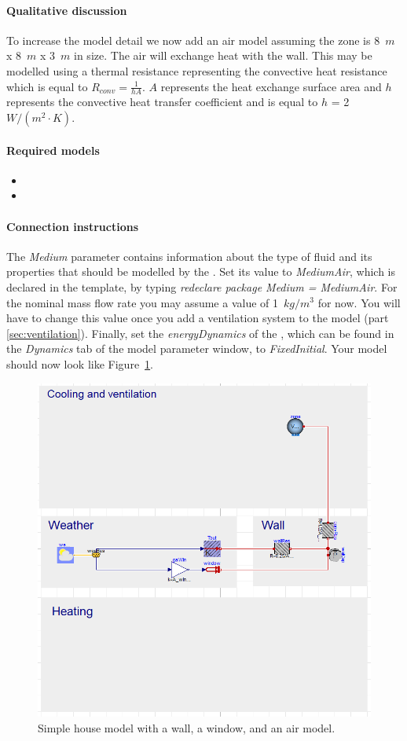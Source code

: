 \documentclass[10pt,a4paper]{article}
\begin{document}
\paragraph{Qualitative discussion}
To increase the model detail we now add an air model assuming the zone is 8~$m$ x 8~$m$ x 3~$m$ in size. The air will exchange heat with the wall. This may be modelled using a thermal resistance representing the convective heat resistance which is equal to $R_{conv}=\frac{1}{hA}$. $A$ represents the heat exchange surface area and $h$ represents the convective heat transfer coefficient and is equal to $h$ = 2~${W/(m^2\cdot K)}$.

\paragraph{Required models}
\begin{itemize}
\item {}
\item {}
\end{itemize}

\paragraph{Connection instructions}
The  \textit{Medium} parameter contains information about the type of fluid and its properties that should be modelled by the . Set its value to \textit{MediumAir}, which is declared in the template, by typing \textit{redeclare package Medium = MediumAir}. For the nominal mass flow rate you may assume a value of 1~$kg/m^3$ for now. You will have to change this value once you add a ventilation system to the model (part \ref{sec:ventilation}). Finally, set the \textit{energyDynamics} of the , which can be found in the \textit{Dynamics} tab of the model parameter window, to \textit{FixedInitial}. Your model should now look like Figure~\ref{fig:airModel}.
\begin{figure}[h]
\centering
\includegraphics[width=0.45\columnwidth]{airModel.png}
\caption{Simple house model with a wall, a window, and an air model.}
\label{fig:airModel}
\end{figure} 
\end{document}
